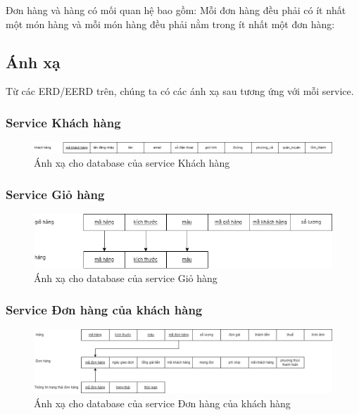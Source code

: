 Đơn hàng và hàng có mối quan hệ bao gồm: Mỗi đơn hàng đều phải có ít nhất một món hàng và mỗi món hàng đều phải nằm trong ít nhất một đơn hàng:


\subsection{Ánh xạ}
\par Từ các ERD/EERD trên, chúng ta có các ánh xạ sau tương ứng với mỗi service.

\subsubsection{Service Khách hàng}
\begin{figure}[!htp]
    \begin{center}
        \includegraphics[width=1\textwidth]{img/database/mapping/mapping-customer.png}
        \newline
        \caption{Ánh xạ cho database của service Khách hàng}
    \end{center}
\end{figure}

\subsubsection{Service Giỏ hàng}
\begin{figure}[!htp]
    \begin{center}
        \includegraphics[width=1\textwidth]{img/database/mapping/mapping-cart.png}
        \newline
        \caption{Ánh xạ cho database của service Giỏ hàng}
    \end{center}
\end{figure}

\subsubsection{Service Đơn hàng của khách hàng}
\begin{figure}[!htp]
    \begin{center}
        \includegraphics[width=1\textwidth]{img/database/mapping/mapping-customer-order.png}
        \newline
        \caption{Ánh xạ cho database của service Đơn hàng của khách hàng}
    \end{center}
\end{figure}


